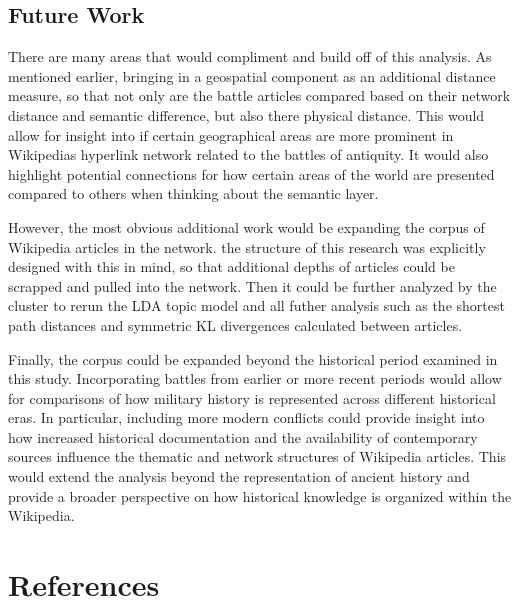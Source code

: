 \documentclass[
  letterpaper,
  DIV=11,
  numbers=noendperiod]{scrartcl}
\begin{document}
\subsection{Future Work}\label{future-work}

There are many areas that would compliment and build off of this
analysis. As mentioned earlier, bringing in a geospatial component as an
additional distance measure, so that not only are the battle articles
compared based on their network distance and semantic difference, but
also there physical distance. This would allow for insight into if
certain geographical areas are more prominent in Wikipedias hyperlink
network related to the battles of antiquity. It would also highlight
potential connections for how certain areas of the world are presented
compared to others when thinking about the semantic layer.

However, the most obvious additional work would be expanding the corpus
of Wikipedia articles in the network. the structure of this research was
explicitly designed with this in mind, so that additional depths of
articles could be scrapped and pulled into the network. Then it could be
further analyzed by the cluster to rerun the LDA topic model and all
futher analysis such as the shortest path distances and symmetric KL
divergences calculated between articles.

Finally, the corpus could be expanded beyond the historical period
examined in this study. Incorporating battles from earlier or more
recent periods would allow for comparisons of how military history is
represented across different historical eras. In particular, including
more modern conflicts could provide insight into how increased
historical documentation and the availability of contemporary sources
influence the thematic and network structures of Wikipedia articles.
This would extend the analysis beyond the representation of ancient
history and provide a broader perspective on how historical knowledge is
organized within the Wikipedia.

\section{References}\label{references}
\end{document}

